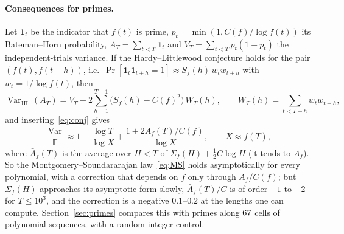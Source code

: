 \documentclass[11pt,a4paper]{article}
\theoremstyle{remark}\newtheorem{remark}[theorem]{Remark}
\newcommand{\Var}{\operatorname{Var}}
\newcommand{\E}{\mathbb{E}}
\begin{document}
\paragraph{Consequences for primes.} Let $\mathbf 1_t$ be the indicator that $f(t)$ is prime,
$p_t=\min(1,C(f)/\log f(t))$ its Bateman--Horn probability, $A_T=\sum_{t<T}\mathbf 1_t$ and
$V_T=\sum_{t<T}p_t(1-p_t)$ the independent-trials variance. If the Hardy--Littlewood conjecture holds for
the pair $(f(t),f(t+h))$, i.e.\ $\Pr[\mathbf 1_t\mathbf 1_{t+h}=1]\approx S_f(h)\,w_tw_{t+h}$ with
$w_t=1/\log f(t)$, then
\begin{equation}\label{eq:varHL}
\Var_{\mathrm{HL}}(A_T)=V_T+2\sum_{h=1}^{T-1}\bigl(S_f(h)-C(f)^2\bigr)\,W_T(h),\qquad W_T(h)=\sum_{t<T-h}w_tw_{t+h},
\end{equation}
and inserting~\eqref{eq:conj} gives
\begin{equation}\label{eq:law}
\frac{\Var}{\E}\approx1-\frac{\log T}{\log X}+\frac{1+2\bar A_f(T)/C(f)}{\log X},\qquad X\approx f(T),
\end{equation}
where $\bar A_f(T)$ is the average over $H<T$ of $\Sigma_f(H)+\tfrac12C\log H$ (it tends to $A_f$).
So the Montgomery--Soundararajan law~\eqref{eq:MS} holds asymptotically for every polynomial, with a
correction that depends on $f$ only through $A_f/C(f)$; but $\Sigma_f(H)$ approaches its asymptotic form
slowly, $\bar A_f(T)/C$ is of order $-1$ to $-2$ for $T\le10^3$, and the correction is a negative
$0.1$--$0.2$ at the lengths one can compute. Section~\ref{sec:primes} compares this with primes along
$67$ cells of polynomial sequences, with a random-integer control.
\end{document}
